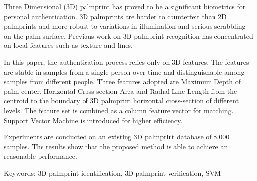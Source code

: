 Three Dimensional (3D) palmprint has proved to be a significant biometrics for personal authentication. 3D palmprints are harder to counterfeit than 2D palmprints and more robust to variations in illumination and serious scrabbling on the palm surface. Previous work on 3D palmprint recognition has concentrated on local features such as texture and lines.

In this paper, the authentication process relies only on 3D features. The features are stable in samples from a single person over time and distinguishable among samples from different people. Three features adopted are Maximum Depth of palm center, Horizontal Cross-section Area and Radial Line Length from the centroid to the boundary of 3D palmprint horizontal cross-section of different levels. The feature set is combined as a column feature vector for matching. Support Vector Machine is introduced for higher efficiency.

Experiments are conducted on an existing 3D palmprint database of 8,000 samples. The results show that the proposed method is able to achieve an reasonable performance.

Keywords: 3D palmprint identification, 3D palmprint verification, SVM